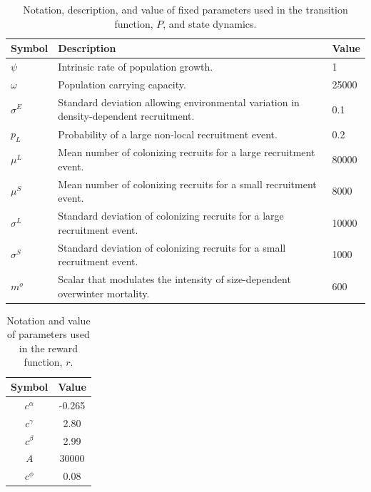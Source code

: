 \documentclass{article}
\begin{document}
\renewcommand{\thetable}{S\arabic{table}}
\begin{longtable}{||l p{9cm} l||}
\caption{Notation, description, and value of fixed parameters used in the transition function, $P$, and state dynamics.}
 \hline
 \textbf{Symbol} & \textbf{Description} & \textbf{Value} \\ [0.5ex]
 \hline\hline
 $\psi$ & Intrinsic rate of population growth. & 1 \\ 
 \hline
 $\omega$ & Population carrying capacity. & 25000 \\ 
 \hline
 $\sigma^E$ & Standard deviation allowing environmental variation in density-dependent recruitment. & 0.1 \\ 
 \hline
 $p_L$ & Probability of a large non-local recruitment event. & 0.2 \\ 
 \hline
 $\mu^L$ & Mean number of colonizing recruits for a large recruitment event. & 80000 \\ 
 \hline
 $\mu^S$ & Mean number of colonizing recruits for a small recruitment event. & 8000 \\ 
 \hline
 $\sigma^L$ & Standard deviation of colonizing recruits for a large recruitment event. & 10000 \\ 
 \hline
 $\sigma^S$ & Standard deviation of colonizing recruits for a small recruitment event. & 1000 \\ 
 \hline
 $m^o$ & Scalar that modulates the intensity of size-dependent overwinter mortality. & 600 \\ 
 \hline
 \end{longtable}

\renewcommand{\thetable}{S\arabic{table}}
\begin{table}[h] 
\centering
\caption{Notation and value of parameters used in the reward function, $r$.}
\vspace{10pt}
\begin{tabular}{|c|c|} 
 \hline
 \textbf{Symbol} & \textbf{Value} \\ [0.5ex]
 \hline\hline
 $c^\alpha$ & -0.265 \\ 
 \hline
 $c^\gamma$ & 2.80 \\ 
 \hline
 $c^\beta$ & 2.99 \\ 
 \hline
 $A$ & 30000 \\ 
 \hline
 $c^\phi$ & 0.08 \\ 
 \hline
\end{tabular}
\end{table}
\end{document}
